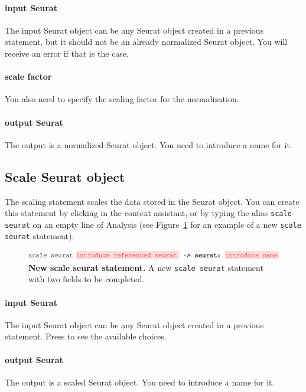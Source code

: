 \paragraph{input Seurat}
The input Seurat object can be any Seurat object created in a previous statement, but it
should not be an already normalized Seurat object. You will receive an error if that is the
case.

\paragraph{scale factor}
You also need to specify the scaling factor for the normalization.

\paragraph{output Seurat}
The output is a normalized Seurat object. You need to introduce a name for
it.

\subsection{Scale Seurat object}
The scaling statement scales the data stored in the Seurat object.
You can create this statement by clicking  in the context assistant,
or by typing the alias \texttt{scale seurat} on an empty line of Analysis (see Figure~\ref{fig:ScaleSeurat}
for an example of a new \texttt{scale seurat} statement).

\begin{figure}[h!tbp]
  \centering
  \includegraphics[width=\figWidthWide]{figures/ScaleSeurat.pdf}
    \caption[New scale seurat statement.]{\textbf{New scale seurat statement.}
    A new \texttt{scale seurat} statement with two fields to be completed.}
\label{fig:ScaleSeurat}
\end{figure}

\paragraph{input Seurat}
The input Seurat object can be any Seurat object created in a previous statement. Press
\keys{\ctrl+\space} to see the available choices.

\paragraph{output Seurat}
The output is a scaled Seurat object. You need to introduce a name for it.

